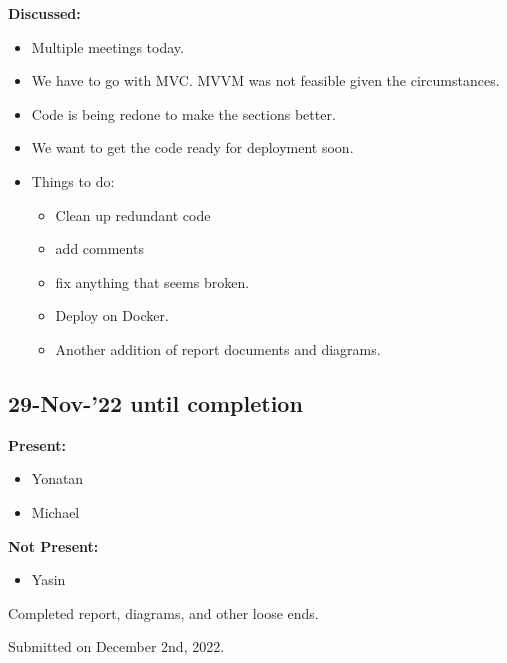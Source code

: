 \documentclass[11pt]{article}
\begin{document}
    \textbf{Discussed:}
    \begin{itemize}
        \item Multiple meetings today.
        \item We have to go with MVC. MVVM was not feasible given the circumstances.
        \item Code is being redone to make the sections better.
        \item We want to get the code ready for deployment soon.
        \item Things to do:
        \begin{itemize}
            \item Clean up redundant code
            \item add comments
            \item fix anything that seems broken.
            \item Deploy on Docker.
            \item Another addition of report documents and diagrams.
        \end{itemize}
    \end{itemize}

    \subsection{29-Nov-’22 until completion}\label{subsec:29-nov-22-until-completion}

    \textbf{Present:}
    \begin{itemize}
        \item Yonatan
        \item Michael
    \end{itemize}

    \textbf{Not Present:}

    \begin{itemize}
        \item Yasin
    \end{itemize}

    Completed report, diagrams, and other loose ends.

    Submitted on December 2nd, 2022.
\end{document}
